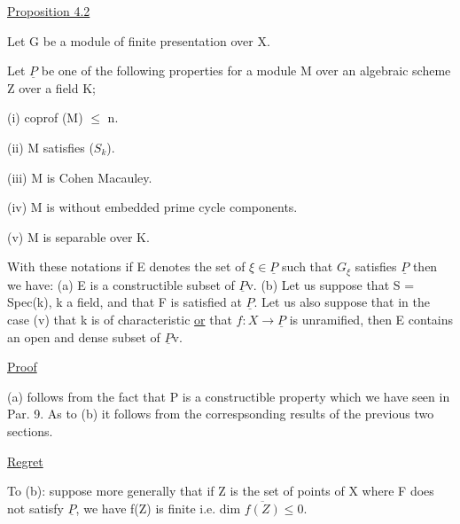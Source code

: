 
\uline{Proposition 4.2}

Let G be a module of finite presentation over X.

Let $\underline{P}$ be one of the following properties for a module M over
an algebraic scheme Z over a field K;

(i) coprof (M) $\leq$ n.

(ii) M satisfies ($S_k$).

(iii) M is Cohen Macauley.

(iv) M is without embedded prime cycle components.

(v) M is separable over K.

With these notations if E denotes the set of $\xi \in \underline{P}$ such that $G_\xi$
satisfies $\underline{P}$ then we have: (a) E is a constructible subset of $\underline{P}$v.
(b) Let us suppose that S = Spec(k), k a field, and that F is
satisfied at $\underline{P}$. Let us also suppose that in the case (v) that k
is of characteristic  \uline{or} that $f\colon X \to \underline{P}$ is unramified, then E
contains an open and dense subset of $\underline{P}$v.

\uline{Proof}

(a) follows from the fact that P is a constructible property
which we have seen in Par. 9. As to (b) it follows from the
correspsonding results of the previous two sections.

\uline{Regret}

To (b): suppose more generally that if Z is the set of
points of X where F does not satisfy $\underline{P}$, we have f(Z) is finite
i.e. dim $\overline{f(Z)} \leq 0$.
